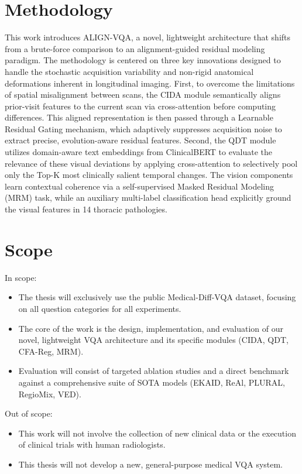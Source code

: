\section{Methodology}
This work introduces ALIGN-VQA, a novel, lightweight architecture that shifts from a brute-force comparison to an alignment-guided residual modeling paradigm. The methodology is centered on three key innovations designed to handle the stochastic acquisition variability and non-rigid anatomical deformations inherent in longitudinal imaging. First, to overcome the limitations of spatial misalignment between scans, the CIDA module semantically aligns prior-visit features to the current scan via cross-attention before computing differences. This aligned representation is then passed through a Learnable Residual Gating mechanism, which adaptively suppresses acquisition noise to extract precise, evolution-aware residual features. Second, the QDT module utilizes domain-aware text embeddings from ClinicalBERT to evaluate the relevance of these visual deviations by applying cross-attention to selectively pool only the Top-K most clinically salient temporal changes. The vision components learn contextual coherence via a self-supervised Masked Residual Modeling (MRM) task, while an auxiliary multi-label classification head explicitly ground the visual features in 14 thoracic pathologies. 


\section{Scope}
In scope:
\begin{itemize}
    \item The thesis will exclusively use the public Medical-Diff-VQA dataset, focusing on all question categories for all experiments.
    \item The core of the work is the design, implementation, and evaluation of our novel, lightweight VQA architecture and its specific modules (CIDA, QDT, CFA-Reg, MRM).
    \item Evaluation will consist of targeted ablation studies and a direct benchmark against a comprehensive suite of SOTA models (EKAID, ReAl, PLURAL, RegioMix, VED).
\end{itemize}

Out of scope:
\begin{itemize}
	\item This work will not involve the collection of new clinical data or the execution of clinical trials with human radiologists.
	\item This thesis will not develop a new, general-purpose medical VQA system.
\end{itemize}


